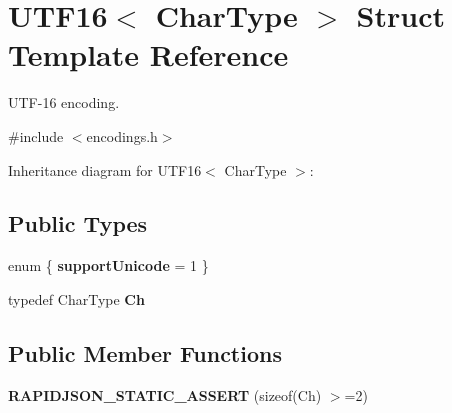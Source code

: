 \hypertarget{struct_u_t_f16}{}\section{U\+T\+F16$<$ Char\+Type $>$ Struct Template Reference}
\label{struct_u_t_f16}


U\+T\+F-\/16 encoding.  




{\ttfamily \#include $<$encodings.\+h$>$}



Inheritance diagram for U\+T\+F16$<$ Char\+Type $>$\+:
\subsection*{Public Types}
\begin{DoxyCompactItemize}
\item 
\mbox{\label{struct_u_t_f16_a286def80fa945e4d43d52fd398f981da}} 
enum \{ {\bfseries support\+Unicode} = 1
 \}
\item 
\mbox{\label{struct_u_t_f16_a811680d50447c98be4fd94c0a27504bb}} 
typedef Char\+Type {\bfseries Ch}
\end{DoxyCompactItemize}
\subsection*{Public Member Functions}
\begin{DoxyCompactItemize}
\item 
\mbox{\label{struct_u_t_f16_a04aeeefa5dcba7c5156bc78a5c1f1557}} 
{\bfseries R\+A\+P\+I\+D\+J\+S\+O\+N\+\_\+\+S\+T\+A\+T\+I\+C\+\_\+\+A\+S\+S\+E\+RT} (sizeof(Ch) $>$=2)
\end{DoxyCompactItemize}
